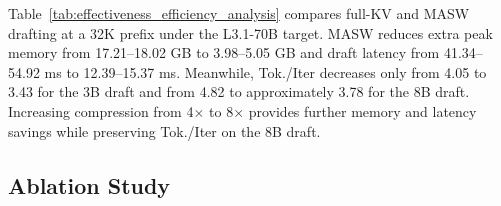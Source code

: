 \begin{table}[h]
    \centering
    \caption{Draft-side effectiveness and efficiency under the L3.1-70B target at 32K prefix length. \textit{Weights} reports frozen draft-backbone weight memory. \textit{Extra Peak} reports all peak GPU memory beyond the backbone weights, including memory-adaptor weights when present, the KV cache, attention masks, logits, and temporary buffers.}
    \label{tab:effectiveness_efficiency_analysis}
\end{table}

Table~\ref{tab:effectiveness_efficiency_analysis} compares full-KV and MASW drafting at a 32K prefix under the L3.1-70B target.
MASW reduces extra peak memory from 17.21--18.02 GB to 3.98--5.05 GB and draft latency from 41.34--54.92 ms to 12.39--15.37 ms.
Meanwhile, Tok./Iter decreases only from 4.05 to 3.43 for the 3B draft and from 4.82 to approximately 3.78 for the 8B draft.
Increasing compression from 4$\times$ to 8$\times$ provides further memory and latency savings while preserving Tok./Iter on the 8B draft.




\subsection{Ablation Study}
\label{subsec:ablation}


